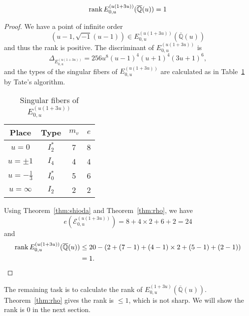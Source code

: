\documentclass[main]{subfiles}
\begin{document}
\begin{thm}
    \begin{equation*}
        \operatorname{rank} E_{0,u}^{(u(1 + 3u))}(\overline{\mathbb{Q}}(u)) = 1
    \end{equation*}
\end{thm}
\begin{proof}
    We have a point of infinite order
    \begin{equation*}
        (u - 1, \sqrt{-1}(u - 1)) \in E_{0,u}^{(u(1 + 3u))}(\overline{\mathbb{Q}}(u))
    \end{equation*}
    and thus the rank is positive.
    The discriminant of $E_{0,u}^{(u(1 + 3u))}$ is
    \begin{equation*}
        \Delta_{E_{0,u}^{(u(1 + 3u))}} = 256u^{8}(u - 1)^{4}(u + 1)^{4}(3u + 1)^{6},
    \end{equation*}
    and the types of the singular fibers of $E_{0,u}^{(u(1 + 3u))}$ are calculated as in Table~\ref{tab:E_{0,u}^{(u(1 + 3u))}} by Tate's algorithm.
    \begin{table}[H]
        \centering
        \caption{Singular fibers of $E_{0,u}^{(u(1 + 3u))}$}
        \begin{tabular}{|c|c|c|c|}
            \hline
            Place            & Type    & $m_v$ & $e$ \\
            \hline
            $u=0$            & $I_2^*$ & 7     & 8   \\
            $u=\pm 1$        & $I_4$   & 4     & 4   \\
            $u=-\frac{1}{3}$ & $I_0^*$ & 5     & 6   \\
            $u=\infty$       & $I_2$   & 2     & 2   \\
            \hline
        \end{tabular}
        \label{tab:E_{0,u}^{(u(1 + 3u))}}
    \end{table}
    Using Theorem~\ref{thm:shioda} and Theorem~\ref{thm:rho}, we have 
    \begin{equation*}
        e(\mathcal{E}_{0,u}^{(u(1 + 3u))}) = 8 + 4 \times 2 + 6 + 2 = 24
    \end{equation*}
    and
    \begin{align*}
        \operatorname{rank} E_{0,u}^{(u(1 + 3u))}(\overline{\mathbb{Q}}(u)) & \leq 20 - (2 + (7 - 1) + (4 - 1) \times 2 + (5 - 1) + (2 - 1)) \\
                                                              &= 1.
    \end{align*}
\end{proof}

The remaining task is to calculate the rank of $E_{0,u}^{(1 + 3u)}(\overline{\mathbb{Q}}(u))$.
Theorem~\ref{thm:rho} gives the rank is $\leq 1$, which is not sharp.
We will show the rank is $0$ in the next section.
\end{document}
